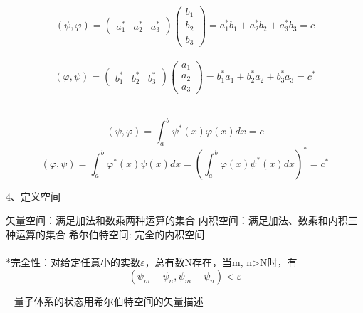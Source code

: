 \begin{frame} 
    \解 ~ \[(\psi, \varphi) = \begin{pmatrix}
        a_1 ^* &
        a_2 ^* &
        a_3 ^*
    \end{pmatrix}
        \begin{pmatrix}
        b_1\\
        b_2\\
        b_3
    \end{pmatrix}
    =a_1 ^* b_1 +a_2 ^* b_2 +a_3 ^* b_3
    =c 
    \]
    ~ \[(\varphi,\psi) = \begin{pmatrix}
        b_1 ^* &
        b_2 ^* &
        b_3 ^*
    \end{pmatrix}
        \begin{pmatrix}
        a_1\\
        a_2\\
        a_3
    \end{pmatrix}
    =b_1 ^* a_1 +b_2 ^* a_2 +b_3 ^* a_3
    =c^* 
    \]
\end{frame} 

\begin{frame} 
    \例 [1. 求定义在x空间的函数的内积]{}

    \解 ~ \[(\psi, \varphi)=\int_a ^b \psi^*(x)  \varphi(x) dx =c\]
    \[(\varphi,\psi)=\int_a ^b \varphi^*(x)\psi(x) dx = (\int_a ^b \varphi(x)\psi^*(x) dx) ^* =c^*\]
\end{frame} 

\begin{frame}
    4、定义空间\\
   \begin{itemize}
       \Item 矢量空间：满足加法和数乘两种运算的集合
       \Item 内积空间：满足加法、数乘和内积三种运算的集合
       \Item 希尔伯特空间:  完全的内积空间\\
       ~~ \\
       *完全性：对给定任意小的实数$\varepsilon$，总有数N存在，当m, n>N时，有\\
       $$ (\psi_m -\psi_n, \psi_m -\psi_n )< \varepsilon $$
   \end{itemize} 
   \Tips ~ 量子体系的状态用希尔伯特空间的矢量描述
\end{frame} 


